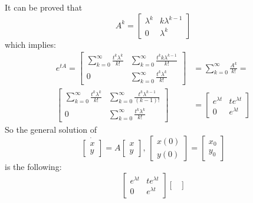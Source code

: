 \begin{example}
    It can be proved that \begin{equation*}
        A^k=\begin{bmatrix}
            \lambda^k & k\lambda^{k-1} \\
            0 & \lambda^k
        \end{bmatrix}
    \end{equation*}
    which implies:
    \begin{align*}
        e^{tA}=\begin{bmatrix}
            \sum_{k=0}^{\infty}\frac{t^k\lambda^k}{k!} & \sum_{k=0}^{\infty}\frac{t^kk\lambda^{k-1}}{k!} \\ 0 & \sum_{k=0}^{\infty}\frac{t^k\lambda^k}{k!}
        \end{bmatrix}&=\sum_{k=0}^{\infty}\frac{A^k}{k!}= \\
        \begin{bmatrix}
            \sum_{k=0}^{\infty}\frac{t^k\lambda^k}{k!} & \sum_{k=0}^{\infty}\frac{t^k\lambda^{k-1}}{(k-1)!} \\ 0 & \sum_{k=0}^{\infty}\frac{t^k\lambda^k}{k!}
        \end{bmatrix}&=\begin{bmatrix}
            e^{\lambda t} & te^{\lambda t} \\
            0 & e^{\lambda t}
        \end{bmatrix}
    \end{align*}
    So the general solution of \begin{equation*}
    \dot{\begin{bmatrix}
    x \\ y
    \end{bmatrix}}=A\begin{bmatrix}
        x \\ y
    \end{bmatrix}, \, \begin{bmatrix}
        x(0) \\ y(0)
    \end{bmatrix}=\begin{bmatrix}
        x_0 \\ y_0
    \end{bmatrix}
    \end{equation*}
    is the following:\begin{equation*}
        \begin{bmatrix}
            e^{\lambda t} & te^{\lambda t} \\
            0 & e^{\lambda t}
        \end{bmatrix}\begin{bmatrix}

\end{bmatrix}
\end{equation*}
\end{example}
